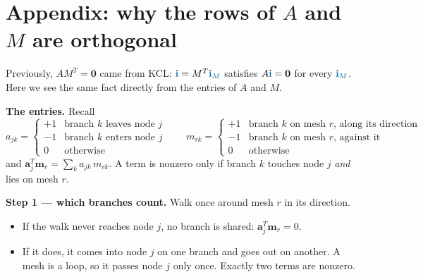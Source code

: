 \documentclass[11pt,a4paper]{article}
\newcommand{\Icol}[1]{\textcolor{ccur}{#1}}
\begin{document}
\clearpage
\section*{Appendix: why the rows of $A$ and $M$ are orthogonal}

Previously, $AM^T = \mathbf{0}$ came from KCL: $\Icol{\mathbf{i}} = M^T\Icol{\mathbf{i}_M}$
satisfies $A\Icol{\mathbf{i}} = \mathbf{0}$ for every $\Icol{\mathbf{i}_M}$. Here we see the
same fact directly from the entries of $A$ and $M$.

\textbf{The entries.} Recall
\[
  a_{jk} = \begin{cases} +1 & \text{branch } k \text{ leaves node } j\\
                         -1 & \text{branch } k \text{ enters node } j\\
                          0 & \text{otherwise} \end{cases}
  \qquad
  m_{rk} = \begin{cases} +1 & \text{branch } k \text{ on mesh } r\text{, along its direction}\\
                         -1 & \text{branch } k \text{ on mesh } r\text{, against it}\\
                          0 & \text{otherwise} \end{cases}
\]
and $\mathbf{a}_j^T\mathbf{m}_r = \sum_k a_{jk}\,m_{rk}$. A term is nonzero only if branch $k$
touches node $j$ \emph{and} lies on mesh $r$.

\textbf{Step 1 --- which branches count.} Walk once around mesh $r$ in its direction.
\begin{itemize}
  \item If the walk never reaches node $j$, no branch is shared: $\mathbf{a}_j^T\mathbf{m}_r = 0$.
  \item If it does, it comes into node $j$ on one branch and goes out on another. A mesh is a
        loop, so it passes node $j$ only once. Exactly two terms are nonzero.
\end{itemize}
\end{document}
